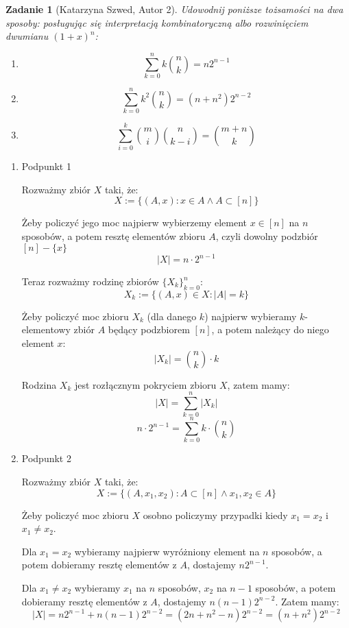 \documentclass{mwart}
\newtheorem{zad}{Zadanie}[section]
\begin{document}
\begin{zad}[Katarzyna Szwed, Autor 2]
    Udowodnij poniższe tożsamości na dwa sposoby: posługując się interpretacją
    kombinatoryczną albo rozwinięciem dwumianu $(1 + x)^n$:
    \begin{enumerate}
        \item \[\sum_{k=0}^{n}k\binom{n}{k} = n2^{n-1}\]
        \item \[\sum_{k=0}^{n}k^2\binom{n}{k}= (n+n^2)2^{n-2}\]
        \item \[\sum_{i=0}^{k}\binom{m}{i}\binom{n}{k-i} = \binom{m+n}{k} \]
    \end{enumerate}
\end{zad}
\begin{mdframed}
    \begin{enumerate}
        \item Podpunkt 1

        Rozważmy zbiór $X$ taki, że:
        \[X := \{ (A, x) : x \in A \wedge A \subset [n]\}\]

        Żeby policzyć jego moc najpierw wybierzemy element $x \in [n]$ na $n$ sposobów, 
        a potem resztę elementów zbioru $A$, czyli dowolny podzbiór $[n]-\{x\}$
        \[|X| = n \cdot 2^{n-1}\] 

        Teraz rozważmy rodzinę zbiorów $\{X_k\}_{k=0}^n$:
        \[X_k := \{(A, x) \in X : |A| = k\}\]

        Żeby policzyć moc zbioru $X_k$ (dla danego $k$) najpierw wybieramy $k$-elementowy zbiór $A$ będący podzbiorem $[n]$, a potem należący
        do niego element $x$:
        \[|X_k| = {n \choose k} \cdot k\]  

        Rodzina $X_k$ jest rozłącznym pokryciem zbioru $X$, zatem mamy:
        \[|X| = \sum_{k=0}^{n} |X_k|\]
        \[n \cdot 2^{n-1} = \sum_{k=0}^{n} k \cdot {n \choose k}\]

        \item Podpunkt 2

        Rozważmy zbiór $X$ taki, że:
        \[X := \{(A, x_1, x_2) : A \subset [n] \wedge x_1, x_2 \in A\}\]

        Żeby policzyć moc zbioru $X$ osobno policzymy przypadki kiedy $x_1 = x_2$ i $x_1 \neq x_2$.

        Dla $x_1 = x_2$ wybieramy najpierw wyróżniony element na $n$ sposobów, a potem dobieramy resztę elementów z $A$, 
        dostajemy $n2^{n-1}$.

        Dla $x_1 \neq x_2$ wybieramy $x_1$ na $n$ sposobów, $x_2$ na $n-1$ sposobów, a potem dobieramy resztę elementów z $A$, 
        dostajemy $n(n-1)2^{n-2}$. 
        Zatem mamy:
        \[|X| = n2^{n-1} + n(n-1)2^{n-2} = (2n + n^2 - n)2^{n-2} = (n + n^2)2^{n-2}\]


\end{enumerate}
\end{mdframed}
\end{document}
